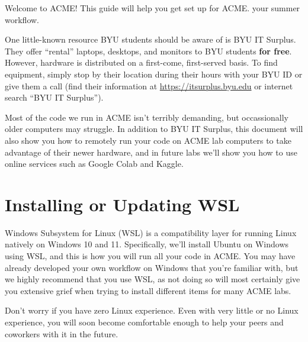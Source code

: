 \ifwindows
{}
\else
{}
\fi


Welcome to ACME!
This guide will help you get set up for
\ifbootcamp
ACME.
\else
your summer workflow.
\fi

\ifbyu
\begin{info}
    One little-known resource BYU students should be aware of is BYU IT Surplus.
    They offer ``rental'' laptops, desktops, and monitors to BYU students \textbf{for free}.
    However, hardware is distributed on a first-come, first-served basis.
    To find equipment, simply stop by their location during their hours with your BYU ID or give them a call (find their information at \url{https://itsurplus.byu.edu} or internet search ``BYU IT Surplus'').

    Most of the code we run in ACME isn't terribly demanding, but occassionally older computers may struggle.
    In addition to BYU IT Surplus, this document will also show you how to remotely run your code on ACME lab computers to take advantage of their newer hardware, and in future labs we'll show you how to use online services such as Google Colab and Kaggle.
\end{info}
\fi

\ifwindows
\section*{Installing or Updating WSL}

Windows Subsystem for Linux (WSL) is a compatibility layer for running Linux natively on Windows 10 and 11.
Specifically, we'll install Ubuntu on Windows using WSL, and this is how you will run all your code in ACME.
You may have already developed your own workflow on Windows that you're familiar with, but we highly recommend that you use WSL, as not doing so will most certainly give you extensive grief when trying to install different items for many ACME labs.

\noindent Don't worry if you have zero Linux experience. 
Even with very little or no Linux experience, you will soon become comfortable enough to help your peers and coworkers with it in the future.

